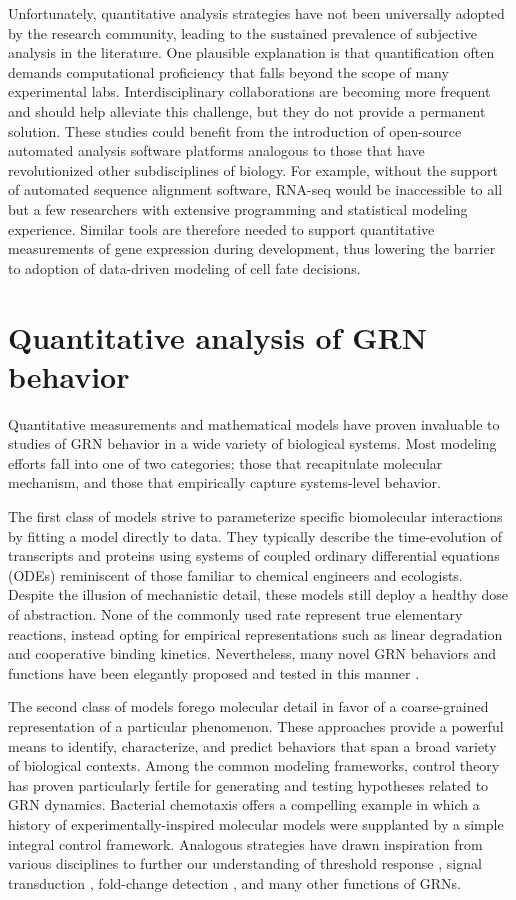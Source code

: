 Unfortunately, quantitative analysis strategies have not been universally adopted by the research community, leading to the sustained prevalence of subjective analysis in the literature. One plausible explanation is that quantification often demands computational proficiency that falls beyond the scope of many experimental labs. Interdisciplinary collaborations are becoming more frequent and should help alleviate this challenge, but they do not provide a permanent solution. These studies could benefit from the introduction of open-source automated analysis software platforms analogous to those that have revolutionized other subdisciplines of biology. For example, without the support of automated sequence alignment software, RNA-seq would be inaccessible to all but a few researchers with extensive programming and statistical modeling experience. Similar tools are therefore needed to support quantitative measurements of gene expression during development, thus lowering the barrier to adoption of data-driven modeling of cell fate decisions.

\section{Quantitative analysis of GRN behavior}

Quantitative measurements and mathematical models have proven invaluable to studies of GRN behavior in a wide variety of biological systems. Most modeling efforts fall into one of two categories; those that recapitulate molecular mechanism, and those that empirically capture systems-level behavior. 

The first class of models strive to parameterize specific biomolecular interactions by fitting a model directly to data. They typically describe the time-evolution of transcripts and proteins using systems of coupled ordinary differential equations (ODEs) reminiscent of those familiar to chemical engineers and ecologists. Despite the illusion of mechanistic detail, these models still deploy a healthy dose of abstraction. None of the commonly used rate represent true elementary reactions, instead opting for empirical representations such as linear degradation and cooperative binding kinetics. Nevertheless, many novel GRN behaviors and functions have been elegantly proposed and tested in this manner \cite{Yu2008,Paulsen2011}. 

The second class of models forego molecular detail in favor of a coarse-grained representation of a particular phenomenon. These approaches provide a powerful means to identify, characterize, and predict behaviors that span a broad variety of biological contexts. Among the common modeling frameworks, control theory has proven particularly fertile for generating and testing hypotheses related to GRN dynamics. Bacterial chemotaxis offers a compelling example in which a history of experimentally-inspired molecular models were supplanted by a simple integral control framework. Analogous strategies have drawn inspiration from various disciplines to further our understanding of threshold response \cite{Melen2005,Graham2010}, signal transduction \cite{Benziger2018}, fold-change detection \cite{Adler2018}, and many other functions of GRNs.




